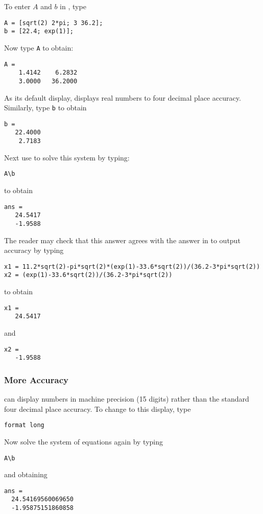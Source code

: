 To enter $A$ and $b$ in \Matlab, type
\begin{verbatim}
A = [sqrt(2) 2*pi; 3 36.2];
b = [22.4; exp(1)];
\end{verbatim}
Now type {\tt A} to obtain:
\begin{verbatim}
A =
    1.4142    6.2832
    3.0000   36.2000
\end{verbatim}
As its default display, \Matlab displays real numbers to four
decimal place accuracy.  Similarly, type {\tt b} to obtain
\begin{verbatim}
b =
   22.4000
    2.7183
\end{verbatim}


Next use \Matlab to solve this system by typing:
\begin{verbatim}
A\b
\end{verbatim}
to obtain
\begin{verbatim}
ans =
   24.5417
   -1.9588
\end{verbatim}

The reader may check that this answer agrees with the answer in
 to \Matlab output accuracy by typing
\begin{verbatim}
x1 = 11.2*sqrt(2)-pi*sqrt(2)*(exp(1)-33.6*sqrt(2))/(36.2-3*pi*sqrt(2))
x2 = (exp(1)-33.6*sqrt(2))/(36.2-3*pi*sqrt(2))
\end{verbatim}
to obtain
\begin{verbatim}
x1 =
   24.5417
\end{verbatim}
and
\begin{verbatim}
x2 =
   -1.9588
\end{verbatim}


\subsubsection*{More Accuracy}

\Matlab can display numbers in machine precision (15 digits) rather
than the standard four decimal place accuracy. To change to this
display, type
\begin{verbatim}
format long
\end{verbatim} 
Now solve the system of equations  again by typing
\begin{verbatim}
A\b
\end{verbatim}  \index{\computer!$\backslash$}
and obtaining
\begin{verbatim}
ans =
  24.54169560069650
  -1.95875151860858
\end{verbatim}


